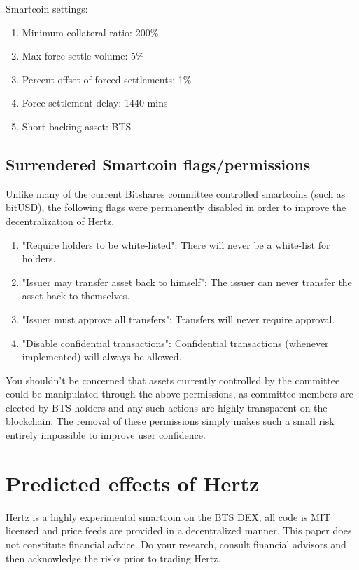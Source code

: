 \documentclass[sigconf]{acmart}
\begin{document}
\noindent Smartcoin settings:

\begin{enumerate}[wide, labelwidth=!, labelindent=0pt]
\item Minimum collateral ratio: 200\%
\item Max force settle volume: 5\%
\item Percent offset of forced settlements: 1\%
\item Force settlement delay: 1440 mins
\item Short backing asset: BTS
\end{enumerate}

\subsection{Surrendered Smartcoin flags/permissions}

Unlike many of the current Bitshares committee controlled smartcoins (such as bitUSD), the following flags were permanently disabled in order to improve the decentralization of Hertz.

\smallskip

\begin{enumerate}[wide, labelwidth=!, labelindent=0pt]
\item "Require holders to be white-listed":	There will never be a white-list for holders.
\item "Issuer may transfer asset back to himself": The issuer can never transfer the asset back to themselves. 
\item "Issuer must approve all transfers": Transfers will never require approval.
\item "Disable confidential transactions": Confidential transactions (whenever implemented) will always be allowed. 
\end{enumerate}

You shouldn't be concerned that assets currently controlled by the committee could be manipulated through the above permissions, as committee members are elected by BTS holders and any such actions are highly transparent on the blockchain. The removal of these permissions simply makes such a small risk entirely impossible to improve user confidence.

\section{Predicted effects of Hertz}

Hertz is a highly experimental smartcoin on the BTS DEX, all code is MIT licensed and price feeds are provided in a decentralized manner. This paper does not constitute financial advice. Do your research, consult financial advisors and then acknowledge the risks prior to trading Hertz.
\end{document}
